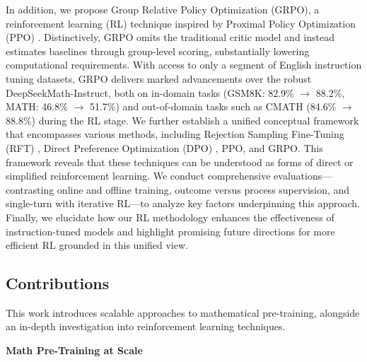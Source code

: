In addition, we propose Group Relative Policy Optimization (GRPO), a reinforcement learning (RL) technique inspired by Proximal Policy Optimization (PPO) \citep{schulman2017proximal}. Distinctively, GRPO omits the traditional critic model and instead estimates baselines through group-level scoring, substantially lowering computational requirements. With access to only a segment of English instruction tuning datasets, GRPO delivers marked advancements over the robust DeepSeekMath-Instruct, both on in-domain tasks (GSM8K: 82.9\% $\rightarrow$ 88.2\%, MATH: 46.8\% $\rightarrow$ 51.7\%) and out-of-domain tasks such as CMATH (84.6\% $\rightarrow$ 88.8\%) during the RL stage. We further establish a unified conceptual framework that encompasses various methods, including Rejection Sampling Fine-Tuning (RFT) \citep{yuan2023scaling}, Direct Preference Optimization (DPO) \citep{dpo}, PPO, and GRPO. This framework reveals that these techniques can be understood as forms of direct or simplified reinforcement learning. We conduct comprehensive evaluations—contrasting online and offline training, outcome versus process supervision, and single-turn with iterative RL—to analyze key factors underpinning this approach. Finally, we elucidate how our RL methodology enhances the effectiveness of instruction-tuned models and highlight promising future directions for more efficient RL grounded in this unified view.

\subsection{Contributions}
This work introduces scalable approaches to mathematical pre-training, alongside an in-depth investigation into reinforcement learning techniques.

\textbf{Math Pre-Training at Scale}

